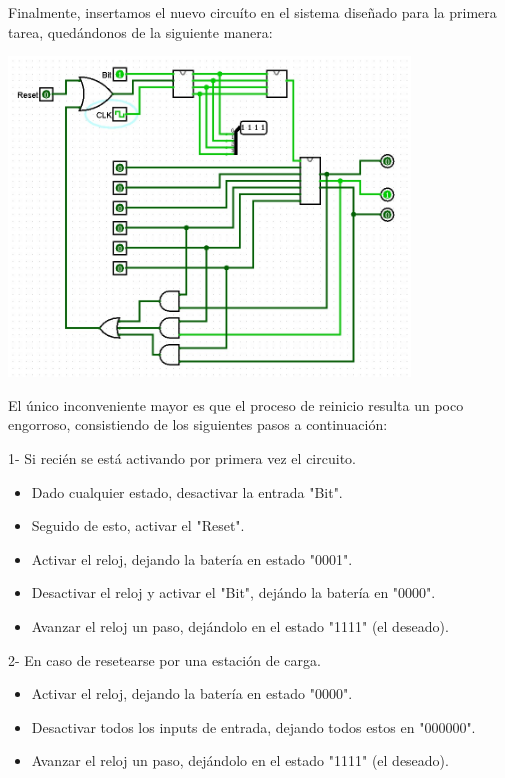 \documentclass[a4paper]{article}
\begin{document}
Finalmente, insertamos el nuevo circuíto en el sistema diseñado para la primera tarea, quedándonos de la siguiente manera:

\begin{center}
	\includegraphics[width=0.8\textwidth]{tarea-2-ej-7.jpg}
\end{center}

El único inconveniente mayor es que el proceso de reinicio resulta un poco engorroso, consistiendo de los siguientes pasos a continuación:

1- Si recién se está activando por primera vez el circuito.

\begin{itemize}
	\item Dado cualquier estado, desactivar la entrada "Bit".
	\item Seguido de esto, activar el "Reset".
	\item Activar el reloj, dejando la batería en estado "0001".
	\item Desactivar el reloj y activar el "Bit", dejándo la batería en "0000".
	\item Avanzar el reloj un paso, dejándolo en el estado "1111" (el deseado).
\end{itemize}

2- En caso de resetearse por una estación de carga.

\begin{itemize}
	\item Activar el reloj, dejando la batería en estado "0000".
	\item Desactivar todos los inputs de entrada, dejando todos estos en "000000".
	\item Avanzar el reloj un paso, dejándolo en el estado "1111" (el deseado).
\end{itemize}
\end{document}
